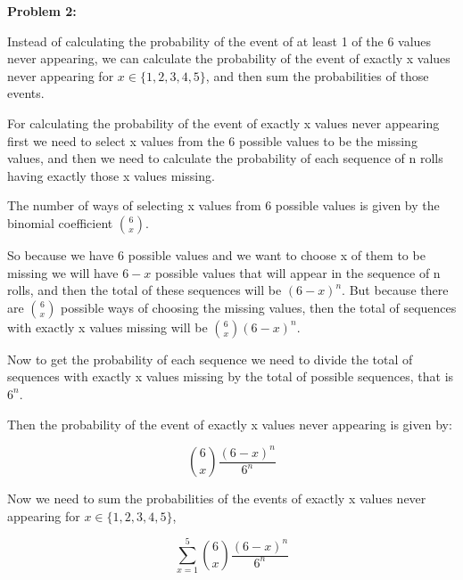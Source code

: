 \textbf{Problem 2:}

\singlespacing

Instead of calculating the probability of the event of at least 1 of the 6 values never appearing,
we can calculate the probability of the event of exactly x values never appearing for $x \in \{1, 2, 3, 4, 5\}$,
and then sum the probabilities of those events.

\singlespacing

For calculating the probability of the event of exactly x values never appearing
first we need to select x values from the 6 possible values to be the missing values,
and then we need to calculate the probability of each sequence of n rolls having exactly
those x values missing.

\singlespacing

The number of ways of selecting x values from 6 possible values is given by the binomial coefficient $\binom{6}{x}$.

\singlespacing

So because we have 6 possible values and we want to choose x of them to be missing we will
have $6 - x$ possible values that will appear in the sequence of n rolls,
and then the total of these sequences will be $(6 - x)^n$. But because there are $\binom{6}{x}$
possible ways of choosing the missing values, then the total of sequences with exactly x values
missing will be $\binom{6}{x} (6 - x)^n$.

\singlespacing

Now to get the probability of each sequence we need to divide the total of sequences with exactly x values
missing by the total of possible sequences, that is $6^n$.

\singlespacing

Then the probability of the event of exactly x values never appearing is given by:

\singlespacing

\begin{equation}
    \binom{6}{x} \frac{(6 - x)^n}{6^n}
\end{equation}

\singlespacing

Now we need to sum the probabilities of the events of exactly x values never appearing for $x \in \{1, 2, 3, 4, 5\}$,

\singlespacing

\begin{equation}
    \sum_{x=1}^{5} \binom{6}{x} \frac{(6 - x)^n}{6^n}
\end{equation}